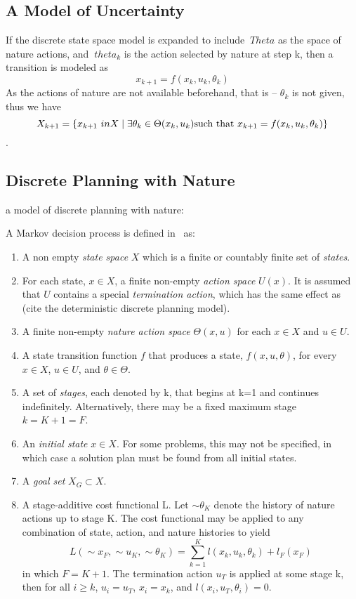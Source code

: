 \subsection{A Model of Uncertainty}

If the discrete state space model is expanded to include \(\ Theta\) as the
space of nature actions, and \(\ theta_k\) is the action selected by nature at
step k, then a transition is modeled as
\[
  x_{k+1} = f(x_k,u_k,\theta_k)
\]
As the actions of nature are not available beforehand, that is -- \(\theta_ k\)
is not given, thus we have
\[
  X_{k+1} = \lbrace x_{k+1} \ in X \mid \exists\theta_k \in \Theta(x_k,u_k)
    \text{such that } x_{k+1} = f(x_k,u_k,\theta_k)\rbrace
\]\cite{Lav06}.

\subsection{Discrete Planning with Nature}
a model of discrete planning with nature:~\cite[pg,496]{Lav06}

A Markov decision process is defined in~\cite[pg.498]{Lav06} as:
\begin{enumerate}
\item A non empty \textit{state space} \(X\) which is a finite or countably
  finite set of \textit{states}.
\item For each state, \(x \in X\), a finite non-empty \textit{action space}
  \(U(x)\). It is assumed that \(U\) contains a special \textit{termination
    action}, which has the same effect as (cite the deterministic discrete
  planning model).
\item A finite non-empty \textit{nature action space} \(\Theta(x,u)\) for each
  \(x \in X\) and \(u \in U\).
\item A state transition function \(f\) that produces a state,
  \(f(x,u,\theta)\), for every \(x \in X\), \(u \in U\), and \(\theta \in
  \Theta\).
\item A set of \textit{stages}, each denoted by k, that begins at k=1 and
  continues indefinitely. Alternatively, there may be a fixed maximum stage \(k
  = K+1=F\).
\item An \textit{initial state} \(x \in X\). For some problems, this may not be
  specified, in which case a solution plan must be found from all initial
  states.

\item A \textit{goal set} \(X_G \subset X\).
\item A stage-additive cost functional L. Let \(\sim{\theta}_K\) denote the
  history of nature actions up to stage K. The cost functional may be applied to
  any combination of state, action, and nature histories to yield
  \[
    L(\sim{x}_F, \sim{u}_K, \sim{\theta}_K) = \sum_{k=1}^{K} l(x_k,u_k,\theta_k)
    + l_F(x_F)
  \]
  in which \(F = K + 1\). The termination action \(u_T\) is applied at some
  stage k, then for all \(i \geq k\), \(u_i = u_T\), \(x_i = x_k\), and
  \(l(x_i,u_T, \theta_i) = 0\).
\end{enumerate}~\cite[pg 498]{Lav06}

